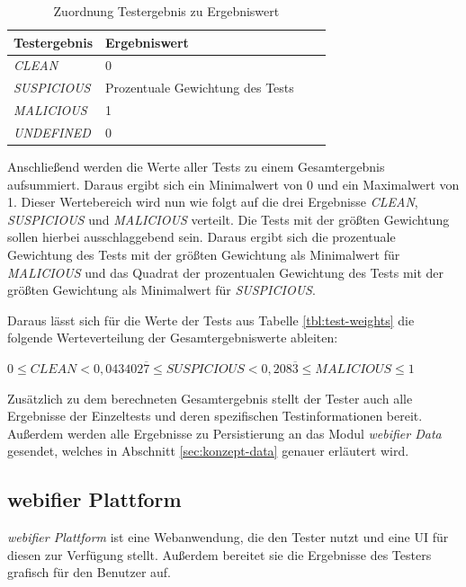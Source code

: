 \begin{table}[H]
\centering
\begin{tabular}{|l|l|l|l|}
\hline
\textbf{Testergebnis} & \textbf{Ergebniswert}\\\hline
\textit{CLEAN} & 0\\\hline
\textit{SUSPICIOUS} & Prozentuale Gewichtung des Tests\\\hline
\textit{MALICIOUS} & 1\\\hline
\textit{UNDEFINED} & 0\\\hline
\end{tabular}
\caption{Zuordnung Testergebnis zu Ergebniswert}
\label{tbl:test-values}
\end{table}

Anschließend werden die Werte aller Tests zu einem Gesamtergebnis aufsummiert. Daraus ergibt sich ein Minimalwert von 0 und ein Maximalwert von 1. Dieser Wertebereich wird nun wie folgt auf die drei Ergebnisse \textit{CLEAN}, \textit{SUSPICIOUS} und \textit{MALICIOUS} verteilt. Die Tests mit der größten Gewichtung sollen hierbei ausschlaggebend sein. Daraus ergibt sich die prozentuale Gewichtung des Tests mit der größten Gewichtung als Minimalwert für \textit{MALICIOUS} und das Quadrat der prozentualen Gewichtung des Tests mit der größten Gewichtung als Minimalwert für \textit{SUSPICIOUS}.

Daraus lässt sich für die Werte der Tests aus Tabelle \ref{tbl:test-weights} die folgende Werteverteilung der Gesamtergebniswerte ableiten:

\begin{center}
$0 \leq CLEAN < 0,043402\overline{7} \leq SUSPICIOUS < 0,208\overline{3} \leq MALICIOUS \leq 1$
\end{center}

Zusätzlich zu dem berechneten Gesamtergebnis stellt der Tester auch alle Ergebnisse der Einzeltests
und deren spezifischen Testinformationen bereit. Außerdem werden alle Ergebnisse zu Persistierung an
das Modul \textit{webifier Data} gesendet, welches in Abschnitt \ref{sec:konzept-data} genauer erläutert wird.

\subsection{webifier Plattform}

\textit{webifier Plattform} ist eine Webanwendung, die den Tester nutzt und eine \ac{UI} für diesen
zur Verfügung stellt. Außerdem bereitet sie die Ergebnisse des Testers grafisch für den Benutzer auf.

